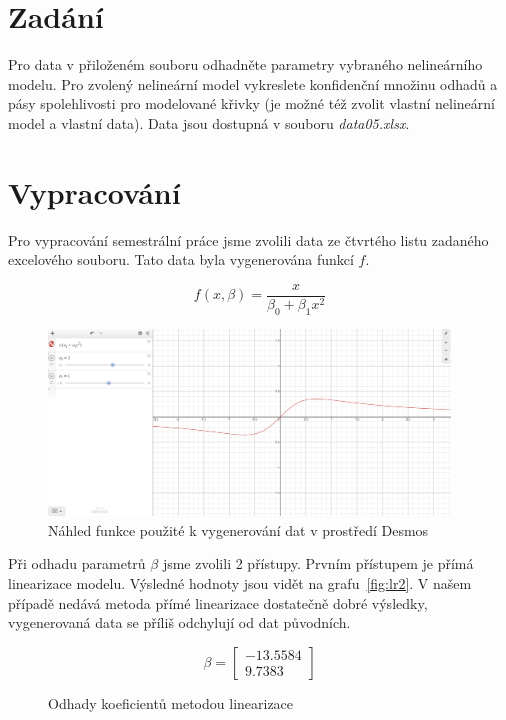 \section{Zadání}

Pro data v přiloženém souboru odhadněte parametry vybraného nelineárního modelu.
Pro zvolený nelineární model vykreslete konfidenční množinu odhadů a pásy spolehlivosti pro modelované křivky (je možné též zvolit vlastní nelineární model a vlastní data).
Data jsou dostupná v souboru \textit{data05.xlsx}.

\section{Vypracování}

Pro vypracování semestrální práce jsme zvolili data ze čtvrtého listu zadaného excelového souboru.
Tato data byla vygenerována funkcí \( f \).

\begin{equation*}
    f(x, \beta) = \frac{x}{\beta_0 + \beta_1 x^2}
\end{equation*}

\begin{figure}[htb]
    \centering
    \includegraphics[width=0.95\textwidth]{graphs/desmos.png}
    \caption{Náhled funkce použité k vygenerování dat v prostředí Desmos}
    \label{fig:lr1}
\end{figure}
\FloatBarrier

Při odhadu parametrů \( \beta \) jsme zvolili 2 přístupy.
Prvním přístupem je přímá linearizace modelu.
Výsledné hodnoty jsou vidět na grafu~\ref{fig:lr2}.
V našem případě nedává metoda přímé linearizace dostatečně dobré výsledky, vygenerovaná data se příliš odchylují od dat původních.

\begin{figure}[htb]
    \centering
    \vspace*{0in}

    \begin{equation*}
        \beta = \left[ \begin{matrix} -13.5584 \\ 9.7383 \end{matrix} \right]
    \end{equation*}

    \label{eq:linear}
    \caption{Odhady koeficientů metodou linearizace}
\end{figure}
\FloatBarrier

